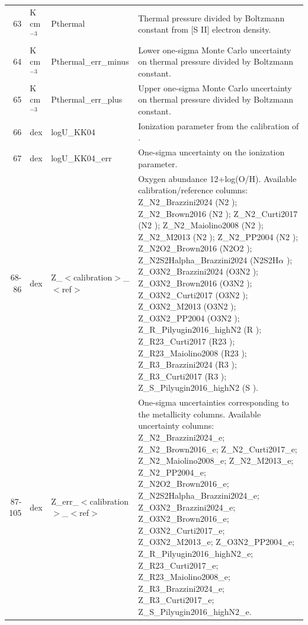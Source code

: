 \begin{longtable}{r p{} p{} p{}}
63 & K cm$^{-3}$ & Pthermal & Thermal pressure divided by Boltzmann constant from [S II] electron density. \\
64 & K cm$^{-3}$ & Pthermal\_err\_minus & Lower one-sigma Monte Carlo uncertainty on thermal pressure divided by Boltzmann constant. \\
65 & K cm$^{-3}$ & Pthermal\_err\_plus & Upper one-sigma Monte Carlo uncertainty on thermal pressure divided by Boltzmann constant. \\
66 & dex & logU\_KK04 & Ionization parameter from the calibration of \citet{Kobulnicky_2004}. \\
67 & dex & logU\_KK04\_err & One-sigma uncertainty on the ionization parameter. \\
68-86 & dex & Z\_$<$calibration$>$\_$<$ref$>$ & Oxygen abundance 12+log(O/H). Available calibration/reference columns: Z\_N2\_Brazzini2024 (N2 \citet{Brazzini_2024}); Z\_N2\_Brown2016 (N2 \citet{Brown_2016}); Z\_N2\_Curti2017 (N2 \citet{Curti_2017}); Z\_N2\_Maiolino2008 (N2 \citet{Maiolino_2008}); Z\_N2\_M2013 (N2 \citet{Marino_2013}); Z\_N2\_PP2004 (N2 \citet{Pettini_2004}); Z\_N2O2\_Brown2016 (N2O2 \citet{Brown_2016}); Z\_N2S2Halpha\_Brazzini2024 (N2S2H$\alpha$ \citet{Brazzini_2024}); Z\_O3N2\_Brazzini2024 (O3N2 \citet{Brazzini_2024}); Z\_O3N2\_Brown2016 (O3N2 \citet{Brown_2016}); Z\_O3N2\_Curti2017 (O3N2 \citet{Curti_2017}); Z\_O3N2\_M2013 (O3N2 \citet{Marino_2013}); Z\_O3N2\_PP2004 (O3N2 \citet{Pettini_2004}); Z\_R\_Pilyugin2016\_highN2 (R \citet{Pilyugin_2016}); Z\_R23\_Curti2017 (R23 \citet{Curti_2017}); Z\_R23\_Maiolino2008 (R23 \citet{Maiolino_2008}); Z\_R3\_Brazzini2024 (R3 \citet{Brazzini_2024}); Z\_R3\_Curti2017 (R3 \citet{Curti_2017}); Z\_S\_Pilyugin2016\_highN2 (S \citet{Pilyugin_2016}). \\
87-105 & dex & Z\_err\_$<$calibration$>$\_$<$ref$>$ & One-sigma uncertainties corresponding to the metallicity columns. Available uncertainty columns: Z\_N2\_Brazzini2024\_e; Z\_N2\_Brown2016\_e; Z\_N2\_Curti2017\_e; Z\_N2\_Maiolino2008\_e; Z\_N2\_M2013\_e; Z\_N2\_PP2004\_e; Z\_N2O2\_Brown2016\_e; Z\_N2S2Halpha\_Brazzini2024\_e; Z\_O3N2\_Brazzini2024\_e; Z\_O3N2\_Brown2016\_e; Z\_O3N2\_Curti2017\_e; Z\_O3N2\_M2013\_e; Z\_O3N2\_PP2004\_e; Z\_R\_Pilyugin2016\_highN2\_e; Z\_R23\_Curti2017\_e; Z\_R23\_Maiolino2008\_e; Z\_R3\_Brazzini2024\_e; Z\_R3\_Curti2017\_e; Z\_S\_Pilyugin2016\_highN2\_e. \\
\hline
\end{longtable}
\endgroup
